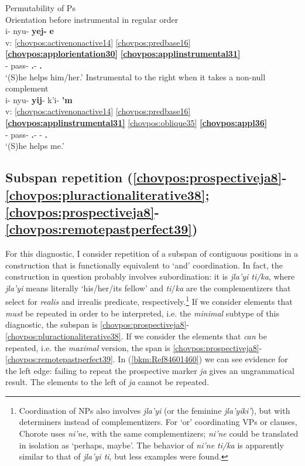 \documentclass[output=paper]{langscibook}
\begin{document}
\ea\label{ex:chor:key:4} Permutability of Ps\\ 
    \ea\label{bkm:Ref84594918} Orientation before instrumental in regular order\\ {
    \glll {} i- nyu- \textbf{yej-} \textbf{e}\\
    v: \ref{chovpos:activenonactive14} \ref{chovpos:predbase16} \textbf{\ref{chovpos:applorientation30}} \textbf{\ref{chovpos:applinstrumental31}}\\ 
    {} \Third{}- pass- \textbf{\Ap.\Or{}}- \textbf{\Ap.\Ins{}}\\
    \glt `(S)he helps him/her.'
    }
    \ex\label{bkm:Ref84601457} Instrumental to the right when it takes a non-null complement\\ {
    \glll {} i- nyu- \textbf{yij}{}- k'i- \textbf{'m}\\
    v: \ref{chovpos:activenonactive14} \ref{chovpos:predbase16} \textbf{\ref{chovpos:applinstrumental31}} \ref{chovpos:oblique35} \textbf{\ref{chovpos:appl36}}\\
    {} \Third{}- pass- \textbf{\Ap.\Ins{}}- \First\Sg{}- \textbf{\Ap.\Or{}}\\
    \glt `(S)he helps me.'
    }
    \z 
\z 

\subsection{Subspan repetition (\ref{chovpos:prospectiveja8}{}-\ref{chovpos:pluractionaliterative38}; \ref{chovpos:prospectiveja8}{}-\ref{chovpos:remotepastperfect39})}

For this diagnostic, I consider repetition of a subspan of contiguous positions in a construction that is functionally equivalent to `and' coordination. In fact, the construction in question probably involves subordination: it is \textit{jla'yi ti/ka}, where \textit{jla'yi} means literally `his/her/its fellow' and \textit{ti}/\textit{ka} are the complementizers that select for \textit{realis} and irrealis predicate, respectively.\footnote{Coordination of NPs also involves \textit{jla'yi} (or the feminine \textit{jla'yiki'}), but with determiners instead of complementizers. For `or' coordinating VPs or clauses, Chorote uses \textit{ni'ne}, with the same complementizers; \textit{ni'ne} could be translated in isolation as `perhaps, maybe'. The behavior of \textit{ni'ne ti/ka} is apparently similar to that of \textit{jla'yi ti}, but less examples were found.} If we consider elements that \textit{must} be repeated in order to be interpreted, i.e. the \textit{minimal} subtype of this diagnostic, the subspan is \ref{chovpos:prospectiveja8}{}-\ref{chovpos:pluractionaliterative38}. If we consider the elements that \textit{can} be repeated, i.e. the \textit{maximal} version, the span is \ref{chovpos:prospectiveja8}{}-\ref{chovpos:remotepastperfect39}. In (\ref{bkm:Ref84601460}) we can see evidence for the left edge: failing to repeat the prospective marker \textit{ja} gives an ungrammatical result. The elements to the left of \textit{ja} cannot be repeated.
\end{document}
